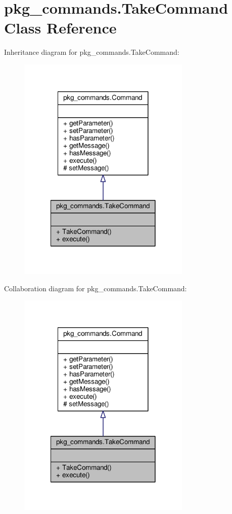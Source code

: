 \hypertarget{classpkg__commands_1_1TakeCommand}{\section{pkg\-\_\-commands.\-Take\-Command Class Reference}
\label{classpkg__commands_1_1TakeCommand}
}


Inheritance diagram for pkg\-\_\-commands.\-Take\-Command\-:
\nopagebreak
\begin{figure}[H]
\begin{center}
\leavevmode
\includegraphics[width=234pt]{classpkg__commands_1_1TakeCommand__inherit__graph}
\end{center}
\end{figure}


Collaboration diagram for pkg\-\_\-commands.\-Take\-Command\-:
\nopagebreak
\begin{figure}[H]
\begin{center}
\leavevmode
\includegraphics[width=234pt]{classpkg__commands_1_1TakeCommand__coll__graph}
\end{center}
\end{figure}
